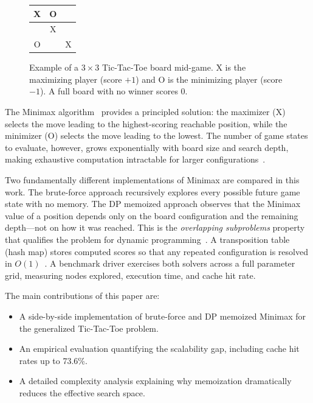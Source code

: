 \documentclass[conference]{IEEEtran}
\begin{document}
\begin{figure}[htbp]
\centering
\setlength{\tabcolsep}{10pt}
\renewcommand{\arraystretch}{1.5}
\begin{tabular}{c|c|c}
 X & O &   \\ \hline
   & X &   \\ \hline
 O &   & X \\
\end{tabular}
\caption{Example of a $3 \times 3$ Tic-Tac-Toe board mid-game.
X is the maximizing player (score $+1$) and O is the minimizing player
(score $-1$). A full board with no winner scores $0$.}
\label{fig:board_example}
\end{figure}

The Minimax algorithm~\cite{b2} provides a principled solution: the
maximizer (X) selects the move leading to the highest-scoring reachable
position, while the minimizer (O) selects the move leading to the lowest.
The number of game states to evaluate, however, grows exponentially with
board size and search depth, making exhaustive computation intractable
for larger configurations~\cite{b3}.

Two fundamentally different implementations of Minimax are compared in
this work. The brute-force approach recursively explores every possible
future game state with no memory. The DP memoized approach observes that
the Minimax value of a position depends only on the board configuration
and the remaining depth---not on how it was reached. This is the
\emph{overlapping subproblems} property that qualifies the problem for
dynamic programming~\cite{b4}. A transposition table (hash map) stores
computed scores so that any repeated configuration is resolved in
$O(1)$~\cite{b5}. A benchmark driver exercises both solvers across a
full parameter grid, measuring nodes explored, execution time, and cache
hit rate.

The main contributions of this paper are:
\begin{itemize}
    \item A side-by-side implementation of brute-force and DP memoized
        Minimax for the generalized Tic-Tac-Toe problem.
    \item An empirical evaluation quantifying the scalability gap,
        including cache hit rates up to 73.6\%.
    \item A detailed complexity analysis explaining why memoization
        dramatically reduces the effective search space.
\end{itemize}
\end{document}
